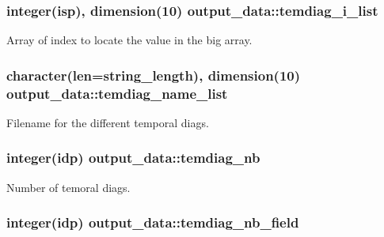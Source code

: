 \subsubsection[{\texorpdfstring{temdiag\+\_\+i\+\_\+list}{temdiag_i_list}}]{\setlength{\rightskip}{0pt plus 5cm}integer(isp), dimension(10) output\+\_\+data\+::temdiag\+\_\+i\+\_\+list}\hypertarget{namespaceoutput__data_a272ff12d370f1ddd453ed84e0aea955b}{}\label{namespaceoutput__data_a272ff12d370f1ddd453ed84e0aea955b}


Array of index to locate the value in the big array. 

\subsubsection[{\texorpdfstring{temdiag\+\_\+name\+\_\+list}{temdiag_name_list}}]{\setlength{\rightskip}{0pt plus 5cm}character(len=string\+\_\+length), dimension(10) output\+\_\+data\+::temdiag\+\_\+name\+\_\+list}\hypertarget{namespaceoutput__data_a891f4f8be197dbbfe91c01ee5260b4c2}{}\label{namespaceoutput__data_a891f4f8be197dbbfe91c01ee5260b4c2}


Filename for the different temporal diags. 

\subsubsection[{\texorpdfstring{temdiag\+\_\+nb}{temdiag_nb}}]{\setlength{\rightskip}{0pt plus 5cm}integer(idp) output\+\_\+data\+::temdiag\+\_\+nb}\hypertarget{namespaceoutput__data_a996655a7d030216dcce6367a59b22ae8}{}\label{namespaceoutput__data_a996655a7d030216dcce6367a59b22ae8}


Number of temoral diags. 

\subsubsection[{\texorpdfstring{temdiag\+\_\+nb\+\_\+field}{temdiag_nb_field}}]{\setlength{\rightskip}{0pt plus 5cm}integer(idp) output\+\_\+data\+::temdiag\+\_\+nb\+\_\+field}\hypertarget{namespaceoutput__data_a6e3150da1e4314b418b4f40c56737551}{}\label{namespaceoutput__data_a6e3150da1e4314b418b4f40c56737551}
